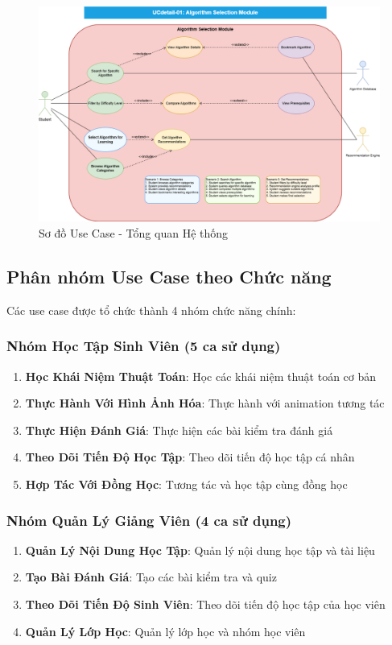 \begin{figure}[H]
\centering
\includegraphics[width=1.0\textwidth]{enhanced-diagrams/UCdetail-01-algorithm-selection.png}
\caption{Sơ đồ Use Case - Tổng quan Hệ thống}
\label{fig:usecase-system-overview}
\end{figure}

\subsection{Phân nhóm Use Case theo Chức năng}
\label{subsec:use-case-functional-groups}

Các use case được tổ chức thành 4 nhóm chức năng chính:

\subsubsection{Nhóm Học Tập Sinh Viên (5 ca sử dụng)}
\begin{enumerate}
    \item \textbf{Học Khái Niệm Thuật Toán}: Học các khái niệm thuật toán cơ bản
    \item \textbf{Thực Hành Với Hình Ảnh Hóa}: Thực hành với animation tương tác
    \item \textbf{Thực Hiện Đánh Giá}: Thực hiện các bài kiểm tra đánh giá
    \item \textbf{Theo Dõi Tiến Độ Học Tập}: Theo dõi tiến độ học tập cá nhân
    \item \textbf{Hợp Tác Với Đồng Học}: Tương tác và học tập cùng đồng học
\end{enumerate}

\subsubsection{Nhóm Quản Lý Giảng Viên (4 ca sử dụng)}
\begin{enumerate}
    \item \textbf{Quản Lý Nội Dung Học Tập}: Quản lý nội dung học tập và tài liệu
    \item \textbf{Tạo Bài Đánh Giá}: Tạo các bài kiểm tra và quiz
    \item \textbf{Theo Dõi Tiến Độ Sinh Viên}: Theo dõi tiến độ học tập của học viên
    \item \textbf{Quản Lý Lớp Học}: Quản lý lớp học và nhóm học viên
\end{enumerate}

